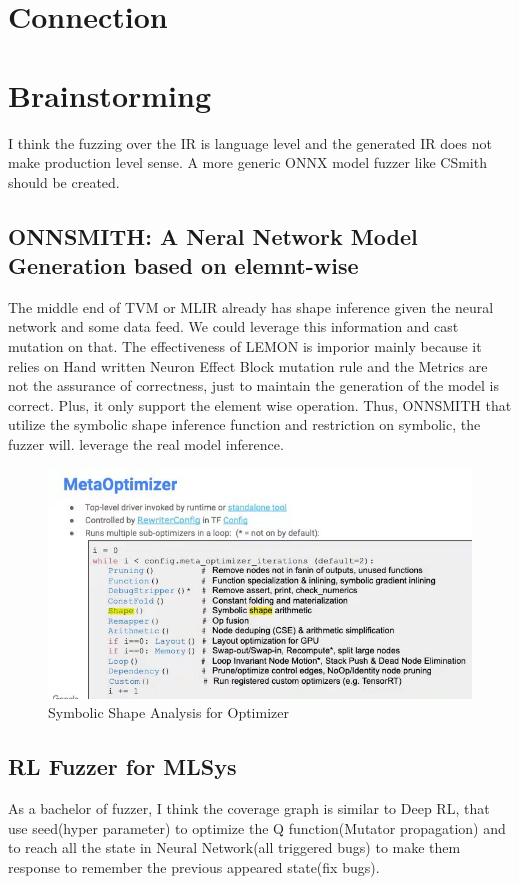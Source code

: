 \documentclass[conference]{IEEEtran}
\begin{document}
\section{Connection}

\section{Brainstorming}
I think the fuzzing over the IR is language level and the generated IR does not make production level sense. A more generic ONNX model fuzzer like CSmith should be created.
\subsection{ONNSMITH: A Neral Network Model Generation based on elemnt-wise}
The middle end of TVM or MLIR already has shape inference given the neural network and some data feed. We could leverage this information and cast mutation on that. The effectiveness of LEMON is imporior mainly because it relies on Hand written Neuron Effect Block mutation rule and the Metrics are not the assurance of correctness, just to maintain the generation of the model is correct. Plus, it only support the element wise operation.
Thus, ONNSMITH that utilize the symbolic shape inference function and restriction on symbolic, the fuzzer will. leverage the real model inference.
\begin{figure}[htbp]
    \centering
    \includegraphics[width=\columnwidth]{./WechatIMG15.jpeg}
    \caption{Symbolic Shape Analysis for Optimizer}
  \end{figure}
  \subsection{RL Fuzzer for MLSys}
As a bachelor of fuzzer, I think the coverage graph is similar to Deep RL, that use seed(hyper parameter) to optimize the Q function(Mutator propagation) and to reach all the state in Neural Network(all triggered bugs) to make them response to remember the previous appeared state(fix bugs).
\end{document}
